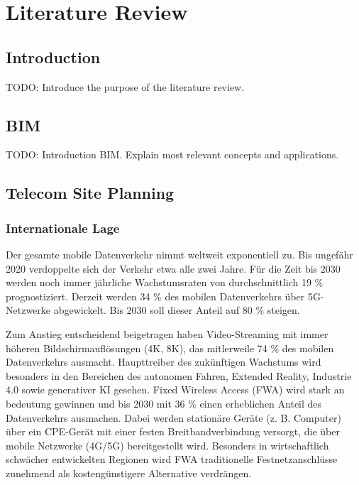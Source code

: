 \chapter{Literature Review}
\label{sec:literature_review}

\section{Introduction}
TODO: Introduce the purpose of the literature review.

\section{BIM}
TODO: Introduction BIM. Explain most relevant concepts and applications.

\section{Telecom Site Planning}

\subsection{Internationale Lage}
Der gesamte mobile Datenverkehr nimmt weltweit exponentiell zu. Bis ungefähr 2020 verdoppelte sich der Verkehr etwa alle zwei Jahre. Für die Zeit bis 2030 werden noch immer jährliche Wachstumsraten von durchschnittlich 19 \% prognostiziert. Derzeit werden 34 \% des mobilen Datenverkehrs über 5G-Netzwerke abgewickelt. Bis 2030 soll dieser Anteil auf 80 \% steigen.

Zum Anstieg entscheidend beigetragen haben Video-Streaming mit immer höheren Bildschirmauflösungen (4K, 8K), das mitlerweile 74 \% des mobilen Datenverkehrs ausmacht. Haupttreiber des zukünftigen Wachstums wird besonders in den Bereichen des autonomen Fahren, Extended Reality, Industrie 4.0 sowie generativer KI gesehen. 
Fixed Wireless Access (FWA) wird stark an bedeutung gewinnen und bis 2030 mit 36 \% einen erheblichen Anteil des Datenverkehrs ausmachen. Dabei werden stationäre Geräte (z. B. Computer) über ein CPE-Gerät mit einer festen Breitbandverbindung versorgt, die über mobile Netzwerke (4G/5G) bereitgestellt wird. Besonders in wirtschaftlich schwächer entwickelten Regionen wird FWA traditionelle Festnetzanschlüsse zunehmend als kostengünstigere Alternative verdrängen. \cite{EricssonMobilityReport}

